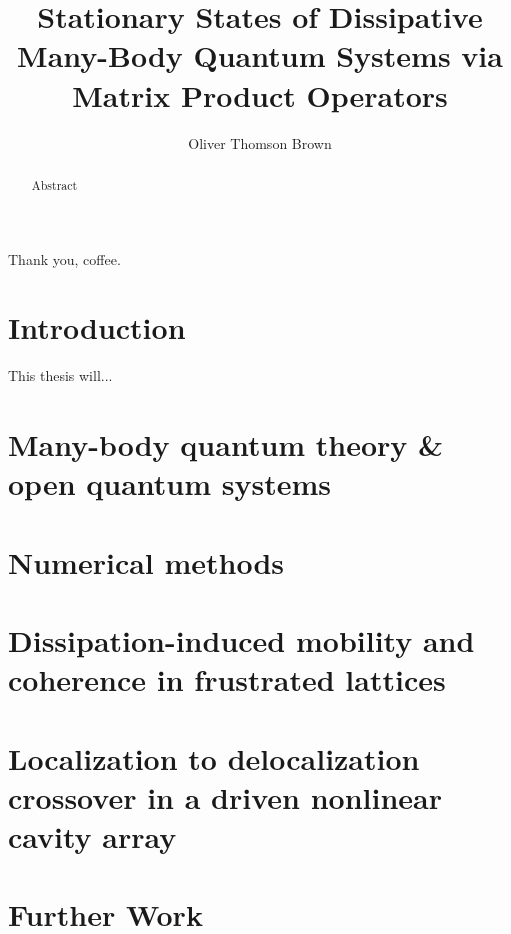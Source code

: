 \documentclass[a4paper,oneside,12pt]{hwthesis}
\author{Oliver Thomson Brown}
\title{Stationary States of Dissipative Many-Body Quantum Systems via Matrix Product Operators}
\newcommand*{\chappath}{../../include/chapters}
\begin{document}
\maketitle


\begin{acknowledgements}
Thank you, coffee.
\end{acknowledgements}

\begin{abstract}
Abstract
\end{abstract}

\tableofcontents

\chapter{Introduction}
\setcounter{page}{1}

This thesis will...

\chapter[MBQT \& OQS]{\label{chp:MBQOQS}Many-body quantum theory \& open quantum systems}



\chapter{\label{chp:NM}Numerical methods}



\chapter[Frustrated lattices]{\label{chp:DIM}Dissipation-induced mobility and coherence in frustrated lattices}



\chapter[Driven nonlinear cavity array]{\label{chp:DNLCA}Localization to delocalization crossover in a driven nonlinear cavity array}



\chapter{Further Work}
\end{document}
